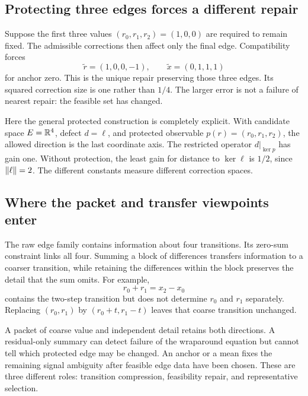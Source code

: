 
\subsection{Protecting three edges forces a different repair}
Suppose the first three values \((r_0,r_1,r_2)=(1,0,0)\) are required to remain fixed. The admissible corrections then affect only the final edge. Compatibility forces
\[
 \widetilde r=(1,0,0,-1),\qquad
 \widetilde x=(0,1,1,1)
\]
for anchor zero. This is the unique repair preserving those three edges. Its squared correction size is one rather than \(1/4\). The larger error is not a failure of nearest repair: the feasible set has changed.

Here the general protected construction is completely explicit. With candidate space \(E=\mathbb R^4\), defect \(d=\ell\), and protected observable \(p(r)=(r_0,r_1,r_2)\), the allowed direction is the last coordinate axis. The restricted operator \(d|_{\ker p}\) has gain one. Without protection, the least gain for distance to \(\ker\ell\) is \(1/2\), since \(\left\lVert\ell\right\rVert=2\). The different constants measure different correction spaces.

\subsection{Where the packet and transfer viewpoints enter}
The raw edge family contains information about four transitions. Its zero-sum constraint links all four. Summing a block of differences transfers information to a coarser transition, while retaining the differences within the block preserves the detail that the sum omits. For example,
\[
 r_0+r_1=x_2-x_0
\]
contains the two-step transition but does not determine \(r_0\) and \(r_1\) separately. Replacing \((r_0,r_1)\) by \((r_0+t,r_1-t)\) leaves that coarse transition unchanged.

A packet of coarse value and independent detail retains both directions. A residual-only summary can detect failure of the wraparound equation but cannot tell which protected edge may be changed. An anchor or a mean fixes the remaining signal ambiguity after feasible edge data have been chosen. These are three different roles: transition compression, feasibility repair, and representative selection.

